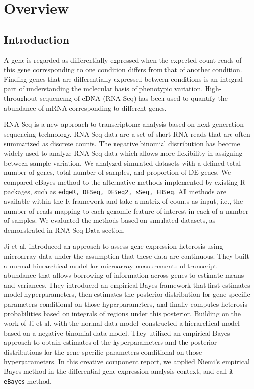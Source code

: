 \chapter{Overview}



\section{Introduction}

A gene is regarded as differentially expressed when the expected count reads of this gene corresponding to one condition differs from that of another condition. Finding genes that are differentially expressed between conditions is an integral part of understanding the molecular basis of phenotypic variation. High-throughout sequencing of cDNA (RNA-Seq) has been used to quantify the abundance of mRNA corresponding to different genes\citep{soneson2013comparison}.


RNA-Seq is a new approach to transcriptome analysis based on next-generation sequencing technology. RNA-Seq data are a set of short RNA reads that are often summarized as discrete counts. The negative binomial distribution has become widely used to analyze RNA-Seq data which allows more flexibility in assigning between-sample variation\citep{ching2014power}. We analyzed simulated datasets with a defined total number of genes, total number of samples, and proportion of DE genes. We compared eBayes\citep{niemi2015empirical} method to the alternative methods implemented by existing R packages, such as {\tt edgeR, DESeq, DESeq2, sSeq, EBSeq}. All methods are available within the R framework and take a matrix of counts as input, i.e., the number of reads mapping to each genomic feature of interest in each of a number of samples. We evaluated the methods based on simulated datasets, as demonstrated in RNA-Seq Data section. 


Ji et al. \citep{ji2014estimation} introduced an approach to assess gene expression heterosis using microarray data under the assumption that these data are continuous. They built a normal hierarchical model for microarray measurements of transcript abundance that allows borrowing of information across genes to estimate means and variances. They introduced an empirical Bayes framework that first estimates model hyperparameters, then estimates the posterior distribution for gene-specific parameters conditional on those hyperparameters, and finally computes heterosis probabilities based on integrals of regions under this posterior. Building on the work of Ji et al. with the normal data model, \citep{niemi2015empirical} constructed a hierarchical model based on a negative binomial data model. They utilized an empirical Bayes approach to obtain estimates of the hyperparameters and the posterior distributions for the gene-specific parameters conditional on those hyperparameters. In this creative component report, we applied Niemi's empirical Bayes method in the differential gene expression analysis context, and call it {\tt eBayes} method. 

